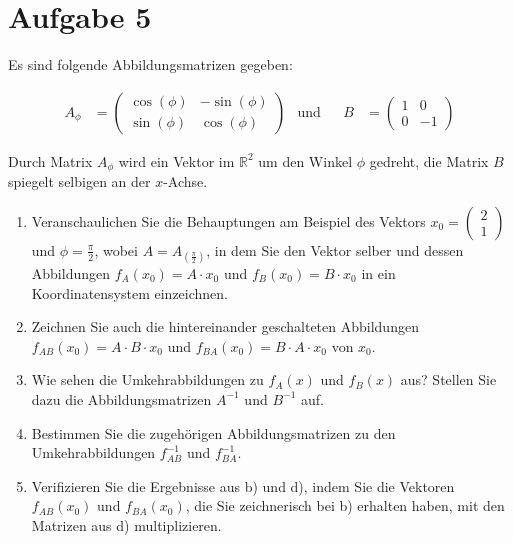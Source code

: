 \documentclass[main.tex]{subfiles}
\begin{document}
\section{Aufgabe 5}
Es sind folgende Abbildungsmatrizen gegeben:

\begin{align*}
    A_\phi &= \begin{pmatrix}
        \cos (\phi) & -\sin (\phi) \\
        \sin (\phi) & \cos (\phi)
    \end{pmatrix}
    &\text{und} & &
    B &= \begin{pmatrix}
        1 &  0 \\
        0 & -1
    \end{pmatrix}
\end{align*}

Durch Matrix $A_\phi$ wird ein Vektor im $\mathbb{R}^2$ um den Winkel $\phi$ gedreht, die Matrix $B$ spiegelt selbigen an der $x$-Achse.

\begin{enumerate}
    \item Veranschaulichen Sie die Behauptungen am Beispiel des Vektors $x_0 = \begin{pmatrix}2 \\ 1 \end{pmatrix}$ und $\phi = \frac{\pi}{2}$, wobei $A=A_{\left(\frac{\pi}{2}\right)}$, in dem Sie den Vektor selber und dessen Abbildungen $f_A(x_0) = A\cdot x_0$ und $f_B(x_0) = B\cdot x_0$ in ein Koordinatensystem einzeichnen.
    \item Zeichnen Sie auch die hintereinander geschalteten Abbildungen $f_{AB}(x_0) = A\cdot B\cdot x_0$ und $f_{BA}(x_0) = B\cdot A\cdot x_0$ von $x_0$.
    \item Wie sehen die Umkehrabbildungen zu $f_A(x)$ und $f_B(x)$ aus? Stellen Sie dazu die Abbildungsmatrizen $A^{-1}$ und $B^{-1}$ auf.
    \item Bestimmen Sie die zugehörigen Abbildungsmatrizen zu den Umkehrabbildungen $f^{-1}_{AB}$ und $f^{-1}_{BA}$.
    \item Verifizieren Sie die Ergebnisse aus b) und d), indem Sie die Vektoren $f_{AB}(x_0)$ und $f_{BA}(x_0)$, die Sie zeichnerisch bei b) erhalten haben, mit den Matrizen aus d) multiplizieren.
\end{enumerate}
\end{document}
